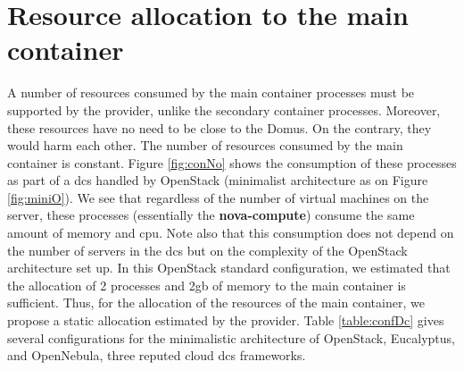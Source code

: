 \section{Resource allocation to the main container}
A number of resources consumed by the main container processes must be supported by the provider, unlike the secondary container processes. Moreover, these resources have no need to be close to the Domus. On the contrary, they would harm each other. The number of resources consumed by the main container is constant. Figure \ref{fig:conNo} shows the consumption of these processes as part of a \glspl{dc} handled by OpenStack (minimalist architecture as on Figure \ref{fig:miniO}). We see that regardless of the number of virtual machines on the server, these processes (essentially the \textbf{nova-compute}) consume the same amount of memory and \acrshort{cpu}. Note also that this consumption does not depend on the number of servers in the \glspl{dc} but on the complexity of the OpenStack architecture set up. In this OpenStack standard configuration, we estimated that the allocation of 2 processes and 2\acrshort{gb} of memory to the main container is sufficient. Thus, for the allocation of the resources of the main container, we propose a static allocation estimated by the provider. Table \ref{table:confDc} gives several configurations for the minimalistic architecture of OpenStack, Eucalyptus, and OpenNebula, three reputed cloud \glspl{dc} frameworks.


